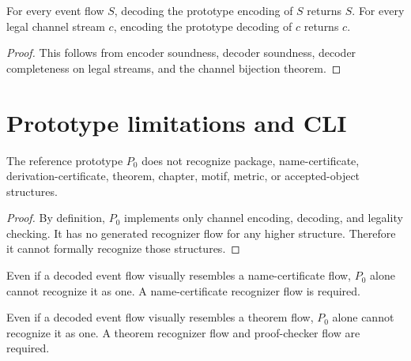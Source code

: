 \begin{corollary}
\label{cor:minimal-prototype-roundtrip-correctness}
For every event flow $S$, decoding the prototype encoding of $S$ returns $S$. For every legal channel stream $c$, encoding the prototype decoding of $c$ returns $c$.
\end{corollary}

\begin{proof}
This follows from encoder soundness, decoder soundness, decoder completeness on legal streams, and the channel bijection theorem.
\end{proof}

\section{Prototype limitations and CLI}
\label{sec:minimal-prototype-limitations-cli}

\begin{theorem}
\label{thm:minimal-prototype-no-math-structure-recognition}
The reference prototype $P_0$ does not recognize package, name-certificate, derivation-certificate, theorem, chapter, motif, metric, or accepted-object structures.
\end{theorem}

\begin{proof}
By definition, $P_0$ implements only channel encoding, decoding, and legality checking. It has no generated recognizer flow for any higher structure. Therefore it cannot formally recognize those structures.
\end{proof}

\begin{corollary}
\label{cor:minimal-prototype-output-not-namecert}
Even if a decoded event flow visually resembles a name-certificate flow, $P_0$ alone cannot recognize it as one. A name-certificate recognizer flow is required.
\end{corollary}

\begin{corollary}
\label{cor:minimal-prototype-output-not-theorem}
Even if a decoded event flow visually resembles a theorem flow, $P_0$ alone cannot recognize it as one. A theorem recognizer flow and proof-checker flow are required.
\end{corollary}

